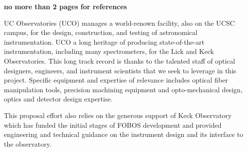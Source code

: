 \documentclass[oneside,11pt]{amsart}
\begin{document}
{\bf no more than 2 pages for references}

\clearpage




\newpage






UC Observatories (UCO) manages a world-renown facility, also on the UCSC campus, for the design, construction, and
testing of astronomical instrumentation.  UCO a long heritage of producing state-of-the-art instrumentation, including
many spectrometers, for the Lick and Keck Observatories.  This long track record is thanks to the talented staff of
optical designers, engineers, and instrument scientists that we seek to leverage in this project.  Specific equipment
and expertise of relevance includes optical fiber manipulation tools, precision machining equipment and opto-mechanical
design, optics and detector design expertise.

This proposal effort also relies on the generous support of Keck Observatory which has funded the initial stages of FOBOS development and provided engineering and technical guidance on the instrument design and its interface to the observatory.  
\end{document}
